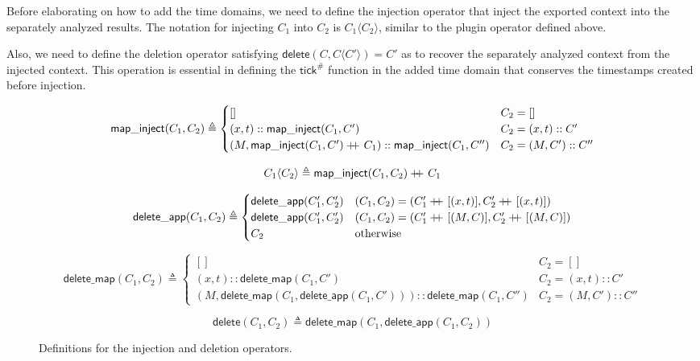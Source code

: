 \documentclass[acmsmall,screen,review]{acmart}
\theoremstyle{definition}
\newcommand*{\cons}{::}
\newcommand*{\A}[1]{{#1}^{\#}}
\newcommand*{\tick}{\mathsf{tick}}
\newcommand*{\mapinject}{\mathsf{map\_inject}}
\newcommand*{\inject}[2]{{#1}\langle{#2}\rangle}
\newcommand*{\deletepre}{\mathsf{delete\_app}}
\newcommand*{\deletemap}{\mathsf{delete\_map}}
\newcommand*{\delete}{\mathsf{delete}}
\newcommand*{\doubleplus}{+\kern-1.3ex+\kern0.8ex}
\begin{document}
Before elaborating on how to add the time domains, we need to define the injection operator that inject the exported context into the separately analyzed results.
The notation for injecting $C_{1}$ into $C_{2}$ is $\inject{C_{1}}{C_{2}}$, similar to the plugin operator defined above.

Also, we need to define the deletion operator satisfying $\delete(C,\inject{C}{C'})=C'$ as to recover the separately analyzed context from the injected context.
This operation is essential in defining the $\A\tick$ function in the added time domain that conserves the timestamps created before injection.

\begin{figure}[htb]
  \footnotesize
  \[
    \mapinject(C_{1},C_{2})\triangleq
    \begin{cases}
      []                                                                   & C_{2}=[]              \\
      (x, t)\cons\mapinject(C_{1},C')                                      & C_{2}=(x,t)\cons C'   \\
      (M, \mapinject(C_{1},C')\doubleplus C_{1})\cons\mapinject(C_{1},C'') & C_{2}=(M,C')\cons C''
    \end{cases}
  \]

  \[
    \inject{C_{1}}{C_{2}}\triangleq \mapinject(C_{1},C_{2})\doubleplus C_{1}
  \]

  \[
    \deletepre(C_{1},C_{2})\triangleq
    \begin{cases}
      \deletepre(C_{1}',C_{2}') & (C_{1},C_{2})=(C_{1}'\doubleplus[(x,t)],C_{2}'\doubleplus[(x,t)]) \\
      \deletepre(C_{1}',C_{2}') & (C_{1},C_{2})=(C_{1}'\doubleplus[(M,C)],C_{2}'\doubleplus[(M,C)]) \\
      C_{2}                     & \text{otherwise}
    \end{cases}
  \]

  \[
    \deletemap(C_{1},C_{2})\triangleq
    \begin{cases}
      []                                                                    & C_{2}=[]               \\
      (x,t)\cons\deletemap(C_{1},C')                                        & C_{2}=(x,t):: C'       \\
      (M, \deletemap(C_{1},\deletepre(C_{1},C')))\cons\deletemap(C_{1},C'') & C_{2}=(M, C')\cons C''
    \end{cases}
  \]

  \[
    \delete(C_{1},C_{2})\triangleq \deletemap(C_{1},\deletepre(C_{1},C_{2}))
  \]
  \caption{Definitions for the injection and deletion operators.}
\end{figure}
\end{document}
